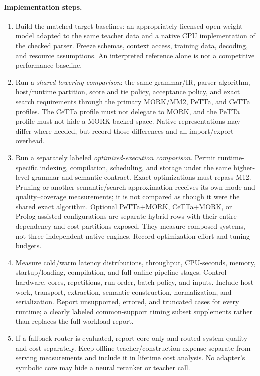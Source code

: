\documentclass[11pt,a4paper]{article}
\begin{document}
\paragraph{Implementation steps.}
\begin{enumerate}
\item Build the matched-target baselines: an appropriately licensed
open-weight model adapted to the same teacher data and a native CPU
implementation of the checked parser. Freeze schemas, context access,
training data, decoding, and resource assumptions. An interpreted reference
alone is not a competitive performance baseline.
\item Run a \emph{shared-lowering comparison}: the same grammar/IR, parser
algorithm, host/runtime partition, score and tie policy, acceptance policy,
and exact search requirements through the primary MORK/MM2, PeTTa, and CeTTa
profiles. The CeTTa profile must not delegate to MORK, and the PeTTa profile
must not hide a MORK-backed space. Native
representations may differ where needed, but record those differences and
all import/export overhead.
\item Run a separately labeled \emph{optimized-execution comparison}.
Permit runtime-specific indexing, compilation, scheduling, and storage under
the same higher-level grammar and semantic contract. Exact optimizations must
repass M12. Pruning or another semantic/search approximation receives its own
mode and quality--coverage measurements; it is not compared as though it were
the shared exact algorithm. Optional PeTTa+MORK, CeTTa+MORK, or
Prolog-assisted configurations are separate hybrid rows with their entire
dependency and cost partitions exposed. They measure composed systems, not
three independent native engines. Record optimization effort and tuning budgets.
\item Measure cold/warm latency distributions, throughput, CPU-seconds,
memory, startup/loading, compilation, and full online pipeline stages.
Control hardware, cores, repetitions, run order, batch policy, and inputs.
Include host work, transport, extraction, semantic construction, normalization,
and serialization. Report unsupported, errored, and truncated cases for every
runtime; a clearly labeled common-support timing subset supplements rather
than replaces the full workload report.
\item If a fallback router is evaluated, report core-only and routed-system
quality and cost separately. Keep offline teacher/construction expense
separate from serving measurements and include it in lifetime cost analysis.
No adapter's symbolic core may hide a neural reranker or teacher call.
\end{enumerate}
\end{document}
